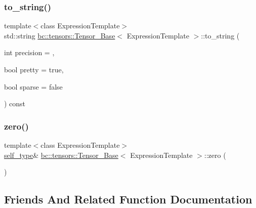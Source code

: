 \subsubsection{\texorpdfstring{to\+\_\+string()}{to\_string()}}
{\footnotesize\ttfamily template$<$class Expression\+Template$>$ \\
std\+::string \hyperlink{classbc_1_1tensors_1_1Tensor__Base}{bc\+::tensors\+::\+Tensor\+\_\+\+Base}$<$ Expression\+Template $>$\+::to\+\_\+string (\begin{DoxyParamCaption}\item[{int}]{precision = {},  }\item[{bool}]{pretty = {\ttfamily true},  }\item[{bool}]{sparse = {\ttfamily false} }\end{DoxyParamCaption}) const\hspace{0.3cm}{\ttfamily [inline]}}

\mbox{\label{classbc_1_1tensors_1_1Tensor__Base_abb334d0f7c42f2fefb945c59e24e9572}} 
\subsubsection{\texorpdfstring{zero()}{zero()}}
{\footnotesize\ttfamily template$<$class Expression\+Template$>$ \\
\hyperlink{classbc_1_1tensors_1_1Expression__Base}{self\+\_\+type}\& \hyperlink{classbc_1_1tensors_1_1Tensor__Base}{bc\+::tensors\+::\+Tensor\+\_\+\+Base}$<$ Expression\+Template $>$\+::zero (\begin{DoxyParamCaption}{ }\end{DoxyParamCaption})\hspace{0.3cm}{\ttfamily [inline]}}



\subsection{Friends And Related Function Documentation}
\mbox{\label{classbc_1_1tensors_1_1Tensor__Base_a6d393379422d905c0c4b43a46e28e87f}} 
